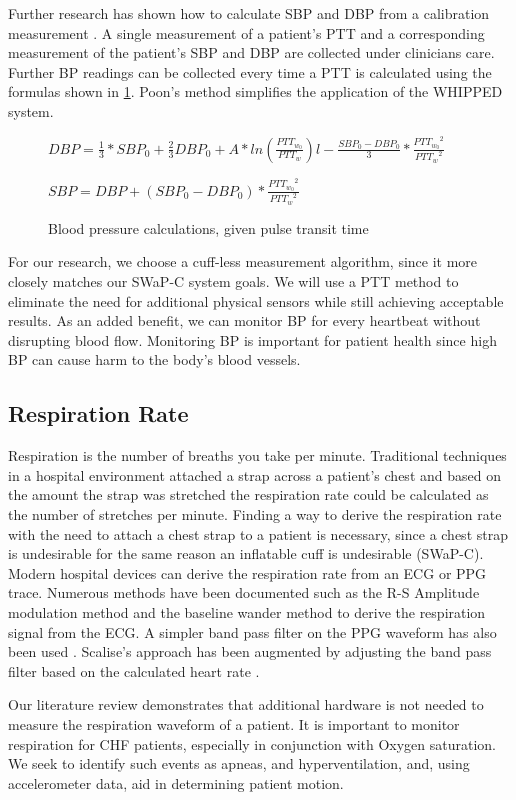 Further research has shown how to calculate SBP and DBP from a calibration measurement \cite{Poon2005}. A single measurement of a patient's PTT and a corresponding measurement of the patient's SBP and DBP are collected under clinicians care. Further BP readings can be collected every time a PTT is calculated using the formulas shown in \cref{fig:BPCalc}.\cite{Poon2005} Poon's method simplifies the application of the WHIPPED system.

\begin{figure}
	\begin{center}

		\label{fig:BPCalc}
		
		$DBP=\frac{1}{3}*SBP_{0} + \frac{2}{3}DBP_{0} + A*ln(\frac{PTT_{w_{0}}}{PTT_{w}})l-\frac{SBP_{0} - DBP_{0}}{3}*\frac{{PTT_{w_{0}}}^{2}}{{PTT_{w}}^{2}}$
		
		$SBP=DBP+(SBP_{0}-DBP_{0})*\frac{{PTT_{w_{0}}}^2}{{PTT_{w}}^2}$
		\caption{Blood pressure calculations, given pulse transit time }
	\end{center}
\end{figure}

For our research, we choose a cuff-less measurement algorithm, since it more closely matches our SWaP-C system goals. We will use a PTT method to eliminate the need for additional physical sensors while still achieving acceptable results. As an added benefit, we can monitor BP for every heartbeat without disrupting blood flow. Monitoring BP is important for patient health since high BP can cause harm to the body's blood vessels.

\subsection{Respiration Rate}
\label{subsec:RespirationRate}

Respiration is the number of breaths you take per minute. Traditional techniques in a hospital environment attached a strap across a patient's chest and based on the amount the strap was stretched the respiration rate could be calculated as the number of stretches per minute. Finding a way to derive the respiration rate with the need to attach a chest strap to a patient is necessary, since a chest strap is undesirable for the same reason an inflatable cuff is undesirable (SWaP-C). Modern hospital devices can derive the respiration rate from an ECG or PPG trace. Numerous methods have been documented such as the R-S Amplitude modulation method \cite{Dziuda2011} \cite{Noor2011} and the baseline wander method \cite{Scully2012} \cite{Ponomarenko2005} to derive the respiration signal from the ECG. A simpler band pass filter on the PPG waveform has also been used \cite{Scalise2011}. Scalise's approach has been augmented by adjusting the band pass filter based on the calculated heart rate \cite{Mason2002}.

Our literature review demonstrates that additional hardware is not needed to measure the respiration waveform of a patient. It is important to monitor respiration for CHF patients, especially in conjunction with Oxygen saturation. We seek to identify such events as apneas, and hyperventilation, and, using accelerometer data, aid in determining patient motion.
